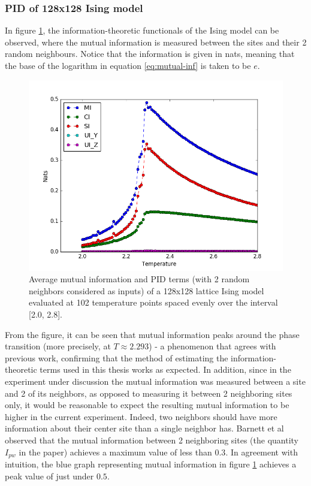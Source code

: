 \documentclass[12pt]{article}
\begin{document}
\subsubsection{PID of 128x128 Ising model}

In figure \ref{fig:ising-128-pid-2-nbs}, the information-theoretic functionals of the Ising model can be observed, where the mutual information is measured between the sites and their 2 random neighbours. Notice that the information is given in nats, meaning that the base of the logarithm in equation \ref{eq:mutual-inf} is taken to be $e$. 

\begin{figure} [h!]
\begin{center}
\includegraphics[width=.9\textwidth]{ising-128-pid-2-nbs}
\caption{Average mutual information and PID terms (with 2 random neighbors considered as inputs) of a 128x128 lattice Ising model evaluated at 102 temperature points spaced evenly over the interval [2.0, 2.8].}
\label{fig:ising-128-pid-2-nbs}
\end{center}
\end{figure}

From the figure, it can be seen that mutual information peaks around the phase transition (more precisely, at $T \approx 2.293$) - a phenomenon that agrees with previous work, confirming that the method of estimating the information-theoretic terms used in this thesis works as expected. In addition, since in the experiment under discussion the mutual information was measured between a site and 2 of its neighbors, as opposed to measuring it between 2 neighboring sites only, it would be reasonable to expect the resulting mutual information to be higher in the current experiment. Indeed, two neighbors should have more information about their center site than a single neighbor has. Barnett et al \cite{barnett-ising} observed that the mutual information between 2 neighboring sites (the quantity $I_{pw}$ in the paper) achieves a maximum value of less than $0.3$. In agreement with intuition, the blue graph representing mutual information in figure \ref{fig:ising-128-pid-2-nbs} achieves a peak value of just under $0.5$.
\end{document}
